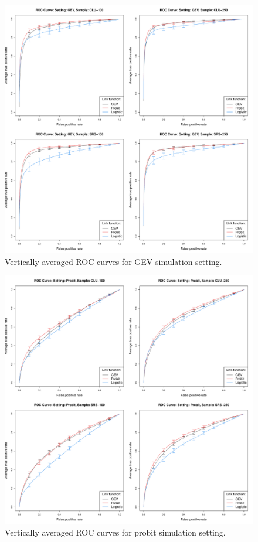 \documentclass[11pt]{article}
\begin{document}
\begin{figure}
  \includegraphics[width=\linewidth]{plots/sim-perf-gev}
  \caption{Vertically averaged ROC curves for GEV simulation setting.}
  \label{rbfig:simrocgev}
\end{figure}

\begin{figure}
  \includegraphics[width=\linewidth]{plots/sim-perf-probit}
  \caption{Vertically averaged ROC curves for probit simulation setting.}
  \label{rbfig:simrocpro}
\end{figure}
\end{document}
